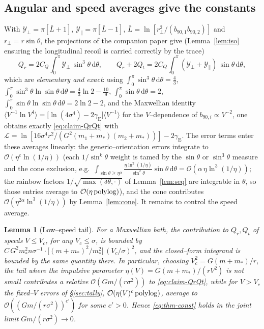 \documentclass[11pt]{article}
\newcommand{\dd}{\mathrm{d}}
\newcommand{\rp}{r_\perp}
\newcommand{\gE}{\gamma_{\mathrm E}}
\newcommand{\Yp}{\mathcal Y_\perp}
\newcommand{\Ypa}{\mathcal Y_\parallel}
\newcommand{\order}[1]{\mathcal O\!\left(#1\right)}
\newtheorem{lemma}{Lemma}
\begin{document}
\subsection{Angular and speed averages give the constants}
With $\Yp=\pi[\bar L+1]$, $\Ypa=\pi[\bar L-1]$, $\bar L=\ln[\rp^2/(b_{90,1}b_{90,2})]$ and
$\rp=r\sin\theta$, the projections of the companion paper give (Lemma~\ref{lem:iso} ensuring the longitudinal
recoil is carried correctly by the trace)
\begin{equation}
  Q_r=2C_Q\!\int_0^\pi\!\Yp\,\sin^3\theta\,\dd\theta,\qquad
  Q_r+2Q_t=2C_Q\!\int_0^\pi\!(\Yp+\Ypa)\,\sin\theta\,\dd\theta,
  \label{eq:Qr-int}
\end{equation}
which are \emph{elementary and exact}: using $\int_0^\pi\sin^3\theta\,\dd\theta=\tfrac43$,
$\int_0^\pi\sin^3\theta\ln\sin\theta\,\dd\theta=\tfrac43\ln2-\tfrac{10}{9}$,
$\int_0^\pi\sin\theta\,\dd\theta=2$, $\int_0^\pi\sin\theta\ln\sin\theta\,\dd\theta=2\ln2-2$, and the
Maxwellian identity $\langle V^{-1}\ln V^4\rangle=\big[\ln(4\sigma^4)-2\gE\big]\langle V^{-1}\rangle$
for the $V$--dependence of $b_{90,i}\propto V^{-2}$, one obtains exactly \eqref{eq:claim-QrQt} with
$\mathcal L=\ln[16\sigma^4r^2/(G^2(m_1+m_*)(m_2+m_*))]-2\gE$. The error terms enter these averages
linearly: the generic--orientation errors integrate to
$\order{\eta^{c}\ln(1/\eta)}$ (each $1/\sin^k\theta$ weight is tamed by the $\sin\theta$ or
$\sin^3\theta$ measure and the cone exclusion, e.g.\
$\int_{\sin\theta\ge\eta^\alpha}\frac{\eta\ln^2(1/\eta)}{\sin^2\theta}\sin\theta\,\dd\theta
=\order{\alpha\,\eta\ln^3(1/\eta)}$; the rainbow factors
$1/\sqrt{\max(\delta\theta,\cdot)}$ of Lemma~\ref{lem:seq} are integrable in $\theta$, so those
entries average to $\order{\eta\,{\rm polylog}}$), and the cone contributes
$\order{\eta^{2\alpha}\ln^3(1/\eta)}$ by Lemma~\ref{lem:cone}. It remains to control the speed
average.

\begin{lemma}[Low--speed tail]
\label{lem:tail}
For a Maxwellian bath, the contribution to $Q_r,Q_t$ of speeds $V\le V_c$, for any
$V_c\le\sigma$, is bounded by
$C\,G^2m_*^2n\sigma^{-1}\cdot\big[(m+m_*)^2/m_*^2\big]\,(V_c/\sigma)^{2}$, and the closed--form
integrand is bounded by the same quantity there. In particular, choosing
$V_c^2=G(m+m_*)/r$, the tail where the impulsive parameter $\eta(V)=G(m+m_*)/(rV^2)$ is \emph{not}
small contributes a relative $\order{G m/(r\sigma^2)}$ to \eqref{eq:claim-QrQt}, while for
$V>V_c$ the fixed--$V$ errors of \S\ref{sec:tally}, $\order{\eta(V)^{c}\,{\rm polylog}}$, average to
$\order{(Gm/(r\sigma^2))^{c'}}$ for some $c'>0$. Hence \eqref{eq:thm-const} holds in the joint limit
$Gm/(r\sigma^2)\to0$.
\end{lemma}
\end{document}
